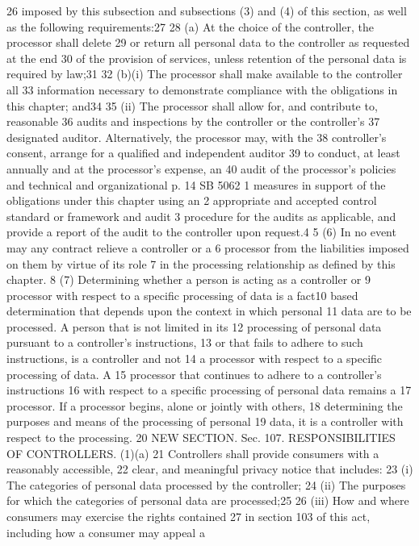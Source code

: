 26 imposed by this subsection and subsections (3) and (4) of this
section, as well as the following requirements:27
28 (a) At the choice of the controller, the processor shall delete
29 or return all personal data to the controller as requested at the end
30 of the provision of services, unless retention of the personal data
is required by law;31
32 (b)(i) The processor shall make available to the controller all
33 information necessary to demonstrate compliance with the obligations
in this chapter; and34
35 (ii) The processor shall allow for, and contribute to, reasonable
36 audits and inspections by the controller or the controller's
37 designated auditor. Alternatively, the processor may, with the
38 controller's consent, arrange for a qualified and independent auditor
39 to conduct, at least annually and at the processor's expense, an
40 audit of the processor's policies and technical and organizational
p. 14 SB 5062
1 measures in support of the obligations under this chapter using an
2 appropriate and accepted control standard or framework and audit
3 procedure for the audits as applicable, and provide a report of the
audit to the controller upon request.4
5 (6) In no event may any contract relieve a controller or a
6 processor from the liabilities imposed on them by virtue of its role
7 in the processing relationship as defined by this chapter.
8 (7) Determining whether a person is acting as a controller or
9 processor with respect to a specific processing of data is a fact10 based determination that depends upon the context in which personal
11 data are to be processed. A person that is not limited in its
12 processing of personal data pursuant to a controller's instructions,
13 or that fails to adhere to such instructions, is a controller and not
14 a processor with respect to a specific processing of data. A
15 processor that continues to adhere to a controller's instructions
16 with respect to a specific processing of personal data remains a
17 processor. If a processor begins, alone or jointly with others,
18 determining the purposes and means of the processing of personal
19 data, it is a controller with respect to the processing.
20 NEW SECTION. Sec. 107. RESPONSIBILITIES OF CONTROLLERS. (1)(a)
21 Controllers shall provide consumers with a reasonably accessible,
22 clear, and meaningful privacy notice that includes:
23 (i) The categories of personal data processed by the controller;
24 (ii) The purposes for which the categories of personal data are
processed;25
26 (iii) How and where consumers may exercise the rights contained
27 in section 103 of this act, including how a consumer may appeal a
